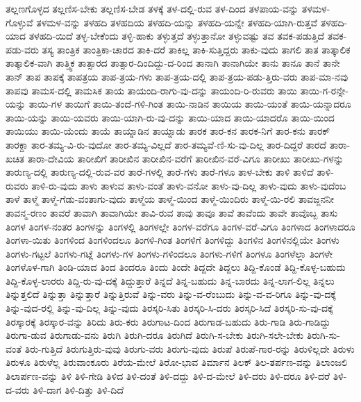 {ತಲ್ಲಣಗೊಳ್ಳದ
ತಲ್ಲಣಿಸ-ಬೇಕು
ತಲ್ಲಣಿಸ-ಬೇಡ
ತಳಕ್ಕೆ
ತಳ-ದಲ್ಲಿ-ರುವ
ತಳ-ದಿಂದ
ತಳಪಾಯ-ವನ್ನು
ತಳಮಳ-ಗೊಳ್ಳುವೆ
ತಳಮಳ-ವನ್ನು
ತಳಹದಿ
ತಳಹದಿಯ
ತಳಹದಿ-ಯನ್ನು
ತಳಹದಿ-ಯನ್ನೇ
ತಳಹದಿ-ಯಾಗಿ-ರುತ್ತವೆ
ತಳಹದಿ-ಯಾದ
ತಳಹದಿ-ಯಿದೆ
ತಳ್ಳ-ಬೇಕೆಂದು
ತಳ್ಳಿ-ಹಾಕು
ತಳ್ಳುತ್ತದೆ
ತಳ್ಳುತ್ತಾನೋ
ತಳ್ಳುವಷ್ಟು
ತವ
ತವಕ-ಪಡುತ್ತಿದೆ
ತವಕ-ಪಡು-ವರು
ತಸ್ಯ
ತಾಂತ್ರಿಕ
ತಾಂತ್ರಿಕಾ-ಚಾರದ
ತಾಕಿ-ದರೆ
ತಾಕಿಲ್ಲ
ತಾಕಿ-ಸುತ್ತಿದ್ದರು
ತಾಕು-ವುದು
ತಾಗಲಿ
ತಾತ
ತಾತ್ಕಾಲಿಕ
ತಾತ್ಕಾಲಿಕ-ವಾಗಿ
ತಾತ್ತ್ವಿಕ
ತಾತ್ಸಾರದ
ತಾತ್ಸಾರ-ದಿಂದಿದ್ದು-ದ-ರಿಂದ
ತಾನಾಗಿ
ತಾನಾಗಿಯೇ
ತಾನು
ತಾನೂ
ತಾನೆ
ತಾನೇ
ತಾನ್
ತಾಪ
ತಾಪಕ್ಕೆ
ತಾಪತ್ರಯ
ತಾಪ-ತ್ರಯ-ಗಳು
ತಾಪ-ತ್ರಯ-ದಲ್ಲಿ
ತಾಪ-ತ್ರಯ-ಪಡು-ತ್ತಿರು-ವರು
ತಾಪ-ಮಾ-ನವು
ತಾಪವು
ತಾಮಸ-ದಲ್ಲಿ
ತಾಮಸಿಕ
ತಾಯ
ತಾಯಂದಿ-ರಾಗು-ವು-ದನ್ನು
ತಾಯಂದಿ-ರಿ-ರುವರು
ತಾಯಿ
ತಾಯಿ-ಗ-ರನ್ಸೇ-ಯನ್ನು
ತಾಯಿ-ಗಳ
ತಾಯಿಗೆ
ತಾಯಿ-ತಂದೆ-ಗಳಿ-ಗಿಂತ
ತಾಯಿ-ನಾಡಿನ
ತಾಯಿಯ
ತಾಯಿ-ಯಂತೆ
ತಾಯಿ-ಯನ್ನಾದರೂ
ತಾಯಿ-ಯನ್ನು
ತಾಯಿ-ಯವರು
ತಾಯಿ-ಯಾಗಿ-ರು-ವು-ದನ್ನು
ತಾಯಿ-ಯಾದ
ತಾಯಿ-ಯಾದರೊ
ತಾಯಿ-ಯಿಂದ
ತಾಯಿಯು
ತಾಯಿ-ಯೆಂದು
ತಾಯೆ
ತಾಯ್ನಾಡಿನ
ತಾಯ್ನಾಡು
ತಾರಕ
ತಾರ-ಕನ
ತಾರಕ-ನಿಗೆ
ತಾರ-ಕನು
ತಾರಕ್
ತಾರಕ್ದಾ
ತಾರ-ತಮ್ಯ-ವಿ-ರು-ವುದೋ
ತಾರ-ತಮ್ಯ-ವಿಲ್ಲದೆ
ತಾರ-ತಮ್ಯವೆ-ಣಿ-ಸು-ವು-ದಿಲ್ಲ
ತಾರ-ದಿದ್ದರೆ
ತಾರದೆ
ತಾರಾ-ಖಚಿತ
ತಾರಾ-ದೇವಿಯ
ತಾರೀಖಿಗೆ
ತಾರೀಖಿನ
ತಾರೀಖಿನ-ವರೆಗೆ
ತಾರೀಖಿನ-ವರೆ-ವಿಗೂ
ತಾರೀಖು
ತಾರೀಖು-ಗಳನ್ನು
ತಾರುಣ್ಯ-ದಲ್ಲಿ
ತಾರುಣ್ಯ-ದಲ್ಲಿ-ರುವ-ವರ
ತಾರೆ-ಗಳಲ್ಲಿ
ತಾರೆ-ಗಳು
ತಾರೆ-ಗಳೂ
ತಾಳ-ಬೇಕು
ತಾಳಿ
ತಾಳಿದೆ
ತಾಳಿ-ರುವರು
ತಾಳಿ-ರು-ವುದು
ತಾಳು
ತಾಳುವ
ತಾಳು-ವಂತೆ
ತಾಳು-ವನೋ
ತಾಳು-ವು-ದಿಲ್ಲ
ತಾಳು-ವುದು
ತಾಳು-ವುದೆಂಬ
ತಾಳೆ
ತಾಳ್ಮೆ
ತಾಳ್ಮೆ-ಗೆಡು-ವಂತಾಗು-ವುದು
ತಾಳ್ಮೆಯ
ತಾಳ್ಮೆ-ಯಿಂದ
ತಾಳ್ಮೆ-ಯಿಂದಿರು
ತಾಳ್ಮೆ-ಯಿ-ರಲಿ
ತಾವಜ್ಜನನೀ
ತಾವನ್ಮ-ರಣಂ
ತಾವರೆ
ತಾವಾಗಿ
ತಾವಾಗಿಯೇ
ತಾವಿ-ರುವ
ತಾವು
ತಾವೂ
ತಾವೆ
ತಾವೆಂದು
ತಾವೇ
ತಾವೊಬ್ಬ
ತಾಸು
ತಿಂಗಳ
ತಿಂಗಳ-ನಂತರ
ತಿಂಗಳನ್ನು
ತಿಂಗಳಲ್ಲಿ
ತಿಂಗಳಲ್ಲೇ
ತಿಂಗಳ-ವರೆಗೂ
ತಿಂಗಳ-ವರೆ-ವಿಗೂ
ತಿಂಗಳಾದ
ತಿಂಗಳಾದರೂ
ತಿಂಗಳಾ-ಯಿತು
ತಿಂಗಳಿಂದ
ತಿಂಗಳಿಂದಲೂ
ತಿಂಗಳಿ-ಗಿಂತ
ತಿಂಗಳಿಗೆ
ತಿಂಗಳಿದ್ದು
ತಿಂಗಳಿನ
ತಿಂಗಳಿನಲ್ಲಿಯೇ
ತಿಂಗಳು
ತಿಂಗಳು-ಗಟ್ಟಲೆ
ತಿಂಗಳು-ಗಟ್ಲೆ
ತಿಂಗಳು-ಗಳ
ತಿಂಗಳು-ಗಳಿಂದಲೂ
ತಿಂಗಳು-ಗಳಿಗೆ
ತಿಂಗಳೂ
ತಿಂಗಳೆಲ್ಲಾ
ತಿಂಗಳೇ
ತಿಂಗಳೊಳ-ಗಾಗಿ
ತಿಂಡಿ-ಯಾದ
ತಿಂದ
ತಿಂದರೂ
ತಿಂದು
ತಿಂದೇ
ತಿದ್ದದೇ
ತಿದ್ದಲು
ತಿದ್ದಿ-ಕೊಂಡೆ
ತಿದ್ದಿ-ಕೊಳ್ಳ-ಬಹುದು
ತಿದ್ದಿ-ಕೊಳ್ಳ-ಲಾರರು
ತಿದ್ದಿ-ರು-ವು-ದಕ್ಕೆ
ತಿದ್ದುತ್ತಾರೆ
ತಿನ್ನದೆ
ತಿನ್ನ-ಬಹುದು
ತಿನ್ನ-ಬಾರದು
ತಿನ್ನ-ಲಾಗ-ಲಿಲ್ಲ
ತಿನ್ನಲು
ತಿನ್ನುತ್ತಲಿದೆ
ತಿನ್ನುತ್ತಾ
ತಿನ್ನುತ್ತಾರೆ
ತಿನ್ನುತ್ತಿರುವೆ
ತಿನ್ನು-ವರು
ತಿನ್ನು-ವ-ರೆಂಬುದು
ತಿನ್ನು-ವ-ವ-ರಿಗೂ
ತಿನ್ನು-ವು-ದಕ್ಕೆ
ತಿನ್ನು-ವುದ-ರಲ್ಲಿ
ತಿನ್ನು-ವು-ದಿಲ್ಲ
ತಿನ್ನು-ವುದು
ತಿರಸ್ಕರಿ-ಸಿತು
ತಿರಸ್ಕರಿ-ಸಿ-ದರು
ತಿರಸ್ಕರಿ-ಸಿದೆ
ತಿರಸ್ಕರಿ-ಸು-ವು-ದಕ್ಕೆ
ತಿರಸ್ಕಾರಕ್ಕೆ
ತಿರಸ್ಕಾರ-ವನ್ನು
ತಿರಿದು
ತಿರು-ಕರು
ತಿರುಗಾಟ-ದಿಂದ
ತಿರುಗಾಡ-ಬಹುದು
ತಿರು-ಗಾಡಿ
ತಿರು-ಗಾಡಿದ್ದು
ತಿರುಗಾ-ಡುವ
ತಿರುಗಾಡು-ವನು
ತಿರುಗಿ
ತಿರುಗಿ-ದರೂ
ತಿರುಗಿದೆ
ತಿರುಗಿ-ಸ-ಬೇಕು
ತಿರುಗಿ-ಸಲೇ-ಬೇಕು
ತಿರುಗಿ-ಸು-ವಂತೆ
ತಿರು-ಗುತ್ತಿದೆ
ತಿರುಗುತ್ತಿರು-ವುವು
ತಿರುಗು-ವರು
ತಿರುಗು-ವುದು
ತಿರುಪೆ
ತಿರುಪೆ-ಗಾರ-ರನ್ನು
ತಿರುಳಿಲ್ಲದೇ
ತಿರುಳು
ತಿರುಳೂ
ತಿರುಳೆಲ್ಲ
ತಿರುವಾಂಕೂರು
ತಿರೆಯ-ಮೇಲೆ
ತಿರೋ-ಭಾವ
ತಿರ್ಮಾನ
ತಿಲಕ್
ತಿಲ-ತರ್ಪಣ-ವನ್ನು
ತಿಲಾಂಜಲಿ
ತಿಲಾರ್ಪಣ-ವನ್ನು
ತಿಳಿ
ತಿಳಿ-ಗೇಡಿ
ತಿಳಿದ
ತಿಳಿ-ದಂತೆ
ತಿಳಿ-ದದ್ದು
ತಿಳಿ-ದ-ಮೇಲೆ
ತಿಳಿ-ದರು
ತಿಳಿ-ದರೂ
ತಿಳಿ-ದರೆ
ತಿಳಿ-ದ-ವರು
ತಿಳಿ-ದಾಗ
ತಿಳಿ-ದಿತ್ತು
ತಿಳಿ-ದಿದೆ
}
